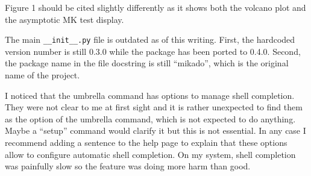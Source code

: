 \begin{point}{} %
Figure 1 should be cited slightly differently as it shows both the
volcano plot and the asymptotic MK test display.
\end{point}


\begin{point}{} %
The main \texttt{\_\_init\_\_.py} file is outdated as of this writing.
First, the hardcoded version number is still 0.3.0 while the package
has been ported to 0.4.0. Second, the package name in the file
docstring is still ``mikado'', which is the original name of the
project.
\end{point}


\begin{point}{} %
I noticed that the umbrella command has options to manage shell
completion. They were not clear to me at first sight and it is rather
unexpected to find them as the option of the umbrella command, which
is not expected to do anything. Maybe a ``setup'' command would
clarify it but this is not essential. In any case I recommend adding a
sentence to the help page to explain that these options allow to
configure automatic shell completion. On my system, shell completion
was painfully slow so the feature was doing more harm than good.
\end{point}

